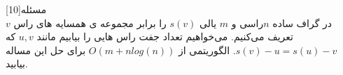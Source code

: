 ‌مسئله[10]
\\
در گراف ساده $n$راسی و $ m$ یالی $s(v)$  را برابر مجموعه ی همسایه های راس $v$ تعریف می‌کنیم. می‌خواهیم تعداد جفت راس هایی را بیابیم مانند $u,v$  که $s(v) - {u} = s(u) - {v}$. الگوریتمی از $ O(m + nlog(n))$ برای حل این مساله بیابید.











